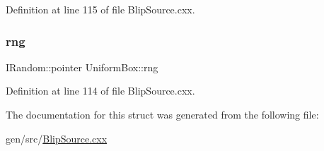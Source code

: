 Definition at line 115 of file Blip\+Source.\+cxx.

\mbox{\label{struct_uniform_box_a462f51835c09f3609f2912ecbe943659}} 
\subsubsection{\texorpdfstring{rng}{rng}}
{\footnotesize\ttfamily I\+Random\+::pointer Uniform\+Box\+::rng}



Definition at line 114 of file Blip\+Source.\+cxx.



The documentation for this struct was generated from the following file\+:\begin{DoxyCompactItemize}
\item 
gen/src/\hyperlink{_blip_source_8cxx}{Blip\+Source.\+cxx}\end{DoxyCompactItemize}

